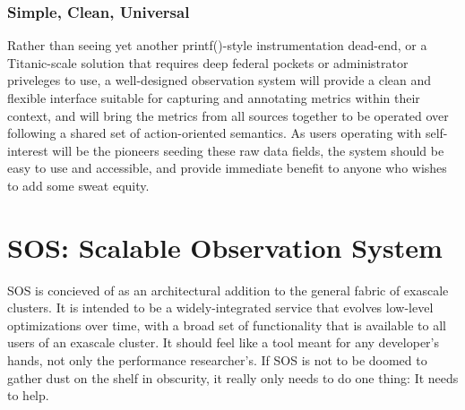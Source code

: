 \subsubsection{Simple, Clean, Universal}
Rather than seeing yet another printf()-style instrumentation
dead-end, or a Titanic-scale solution that requires deep federal
pockets or administrator priveleges to use, a well-designed
observation system will provide a clean and flexible interface
suitable for capturing and annotating metrics within their context,
and will bring the metrics from all sources together to be operated
over following a shared set of action-oriented semantics.
%
As users operating with self-interest will be the pioneers seeding
these raw data fields, the system should be easy to use and
accessible, and provide immediate benefit to anyone who wishes to add
some sweat equity.




\section{SOS: Scalable Observation System}

SOS is concieved of as an architectural addition to the general fabric
of exascale clusters.
%
It is intended to be a widely-integrated service that evolves
low-level optimizations over time, with a broad set of functionality
that is available to all users of an exascale cluster.
%
It should feel like a tool meant for any developer's hands, not only
the performance researcher's.
%
If SOS is not to be doomed to gather dust on the shelf in obscurity,
it really only needs to do one thing: It needs to help.


